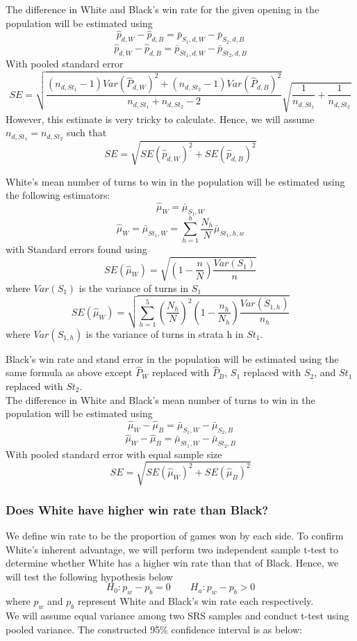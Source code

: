 \documentclass[11pt,]{article}
\begin{document}
The difference in White and Black's win rate for the given opening in
the population will be estimated using
\[\hat p_{d,W} - \hat p_{d,B} = \bar p_{S_1,d,W} - \bar p_{S_2,d,B}\]
\[\hat p_{d,W} - \hat p_{d,B} = \bar p_{St_1,d,W} - \bar p_{St_2,d,B}\]
With pooled standard error
\[SE = \sqrt{\frac{(n_{d,St_1}-1)Var(\hat P_{d,W})^2 + (n_{d,St_2}-1)Var(\hat P_{d,B})^2}{n_{d,St_1} + n_{d,St_2} -2}}\sqrt{\frac{1}{n_{d,St_1}}
+\frac{1}{n_{d,St_2}}}\] However, this estimate is very tricky to
calculate. Hence, we will assume \(n_{d,St_1} = n_{d,St_2}\) such that
\[SE = \sqrt{SE(\hat p_{d, W})^2 +  SE(\hat p_{d, B})^2}\] \newline

White's mean number of turns to win in the population will be estimated
using the following estimators: \[\hat \mu_W = \bar \mu_{S_1, W}\]
\[\hat \mu_W = \bar \mu_{St_1, W} = \sum_{h=1}^{h}\frac{N_h}{N}\bar \mu_{St_1,h,w}\]
with Standard errors found using
\[SE(\hat \mu_{W}) = \sqrt{(1-\frac{n}{N})\frac{Var(S_1)}{n}}\] where
\(Var(S_1)\) is the variance of turns in \(S_1\)
\[SE(\hat \mu_{W}) = \sqrt{\sum_{h=1}^{5}(\frac{N_h}{N})^2(1-\frac{n_h}{N_h})\frac{Var(S_{1,h})}{n_h}}\]
where \(Var(S_{1,h})\) is the variance of turns in strata h in \(St_1\).

Black's win rate and stand error in the population will be estimated
using the same formula as above except \(\hat P_{W}\) replaced with
\(\hat P_{B}\), \(S_1\) replaced with \(S_2\), and \(St_1\) replaced
with \(St_2\).\\
\newline The difference in White and Black's mean number of turns to win
in the population will be estimated using
\[\hat \mu_{W} - \hat \mu_{B} = \bar \mu_{S_1,W} - \bar \mu_{S_2,B}\]
\[\hat \mu_{W} - \hat \mu_{B} = \bar \mu_{St_1,W} - \bar \mu_{St_2,B}\]
With pooled standard error with equal sample size
\[SE = \sqrt{SE(\hat \mu_W)^2 + SE(\hat \mu_B)^2}\]

\hypertarget{does-white-have-higher-win-rate-than-black}{%
\subsubsection{\texorpdfstring{\textbf{Does White have higher win rate
than
Black?}}{Does White have higher win rate than Black?}}\label{does-white-have-higher-win-rate-than-black}}

We define win rate to be the proportion of games won by each side. To
confirm White's inherent advantage, we will perform two independent
sample t-test to determine whether White has a higher win rate than that
of Black. Hence, we will test the following hypothesis below
\[H_0 : p_w - p_b = 0 \quad  \quad H_a : p_w - p_b > 0\] where \(p_w\)
and \(p_b\) represent White and Black's win rate each respectively.\\
\newline We will assume equal variance among two SRS samples and conduct
t-test using pooled variance. The constructed 95\% confidence interval
is as below:
\end{document}
